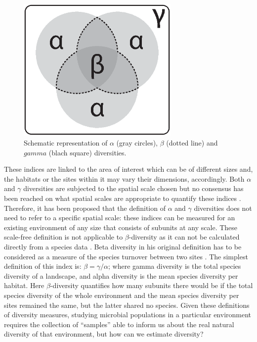 \begin{figure}[!tb]
	\centering
	\includegraphics[width=0.7\textwidth]{./figures/Introduction/diversities}
  	\caption{Schematic representation of $\alpha$ (gray circles), $\beta$ (dotted line) and $gamma$ (blach square) diversities.\label{fig:diversities}}
\end{figure}
These indices are linked to the area of interest which can be of different sizes and, the habitats or the sites within it may vary their dimensions, accordingly. Both $\alpha$ and $\gamma$ diversities are subjected to the spatial scale chosen but no consensus has been reached on what spatial scales are appropriate to quantify these indices \cite{whittaker2001scale}. Therefore, it has been proposed that the definition of $\alpha$ and $\gamma$ diversities does not need to refer to a specific spatial scale: these indices can be measured for an existing environment of any size that consists of subunits at any scale. These scale-free definition is not applicable to $\beta$-diversity as it can not be calculated directly from a species data \cite{tuomisto2010diversity}. Beta diversity in his original definition has to be considered as a measure of the species turnover between two sites \cite{whittaker1960vegetation}. The simplest definition of this index is: $\beta = \gamma/\alpha$; where gamma diversity is the total species diversity of a landscape, and alpha diversity is the mean species diversity per habitat. Here $\beta$-diversity quantifies how many subunits there would be if the total species diversity of the whole environment and the mean species diversity per sites remained the same, but the latter shared no species. Given these definitions of diversity measures, studying microbial populations in a particular environment requires the collection of ``samples'' able to inform us about the real natural diversity of that environment, but how can we estimate diversity?\\
